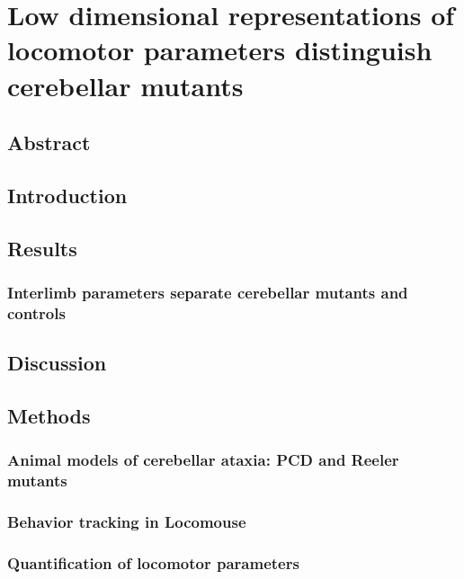 
%

\chapter{Low dimensional representations of locomotor parameters distinguish cerebellar mutants}
\label{cha:lda}
\glsresetall

\section{Abstract}
\section{Introduction}

\section{Results}
\subsection{Interlimb parameters separate cerebellar mutants and controls}
\section{Discussion}
\section{Methods}
\subsection{Animal models of cerebellar ataxia: PCD and Reeler mutants} %
\subsection{Behavior tracking in Locomouse}
\subsection{Quantification of locomotor parameters} %
